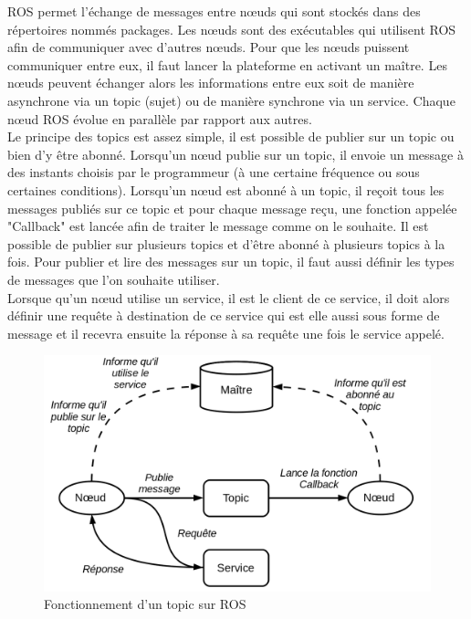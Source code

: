 \documentclass[a4paper,french, titlepage]{book}
\begin{document}
ROS permet l'échange de messages entre nœuds qui sont stockés dans des répertoires nommés packages. Les nœuds sont des exécutables qui utilisent ROS afin de communiquer avec d'autres nœuds. Pour que les nœuds puissent communiquer entre eux, il faut lancer la plateforme en activant un maître. Les nœuds peuvent échanger alors les informations entre eux soit de manière asynchrone via un topic (sujet) ou de manière synchrone via un service. Chaque nœud ROS évolue en parallèle par rapport aux autres.\\

Le principe des topics est assez simple, il est possible de publier sur un topic ou bien d'y être abonné. Lorsqu'un nœud publie sur un topic, il envoie un message à des instants choisis par le programmeur (à une certaine fréquence ou sous certaines conditions). Lorsqu'un nœud est abonné à un topic, il reçoit tous les messages publiés sur ce topic et pour chaque message reçu, une fonction appelée "Callback" est lancée afin de traiter le message comme on le souhaite. Il est possible de publier sur plusieurs topics et d'être abonné à plusieurs topics à la fois. Pour publier et lire des messages sur un topic, il faut aussi définir les types de messages que l'on souhaite utiliser.\\

Lorsque qu'un nœud utilise un service, il est le client de ce service, il doit alors définir une requête à destination de ce service qui est elle aussi sous forme de message et il recevra ensuite la réponse à sa requête une fois le service appelé.




\begin{figure}[H] 
\begin{center}
\includegraphics[scale=0.4]{Images/topic.png} 
\end{center}
\caption{Fonctionnement d'un topic sur ROS}
\label{topic}
\end{figure} 
\end{document}
